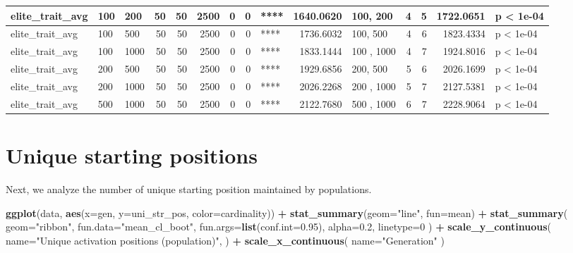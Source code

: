 \documentclass[]{book}
\newenvironment{Shaded}{\begin{snugshade}}{\end{snugshade}}
\newcommand{\DataTypeTok}[1]{\textcolor[rgb]{0.13,0.29,0.53}{#1}}
\newcommand{\DecValTok}[1]{\textcolor[rgb]{0.00,0.00,0.81}{#1}}
\newcommand{\FloatTok}[1]{\textcolor[rgb]{0.00,0.00,0.81}{#1}}
\newcommand{\KeywordTok}[1]{\textcolor[rgb]{0.13,0.29,0.53}{\textbf{#1}}}
\newcommand{\NormalTok}[1]{#1}
\newcommand{\OperatorTok}[1]{\textcolor[rgb]{0.81,0.36,0.00}{\textbf{#1}}}
\newcommand{\StringTok}[1]{\textcolor[rgb]{0.31,0.60,0.02}{#1}}
\begin{document}
\begin{tabular}{l|l|l|r|r|r|r|r|l|r|l|r|r|r|l}
\hline
elite\_trait\_avg & 100 & 200 & 50 & 50 & 2500 & 0 & 0 & **** & 1640.0620 & 100, 200 & 4 & 5 & 1722.0651 & p < 1e-04\\
\hline
elite\_trait\_avg & 100 & 500 & 50 & 50 & 2500 & 0 & 0 & **** & 1736.6032 & 100, 500 & 4 & 6 & 1823.4334 & p < 1e-04\\
\hline
elite\_trait\_avg & 100 & 1000 & 50 & 50 & 2500 & 0 & 0 & **** & 1833.1444 & 100 , 1000 & 4 & 7 & 1924.8016 & p < 1e-04\\
\hline
elite\_trait\_avg & 200 & 500 & 50 & 50 & 2500 & 0 & 0 & **** & 1929.6856 & 200, 500 & 5 & 6 & 2026.1699 & p < 1e-04\\
\hline
elite\_trait\_avg & 200 & 1000 & 50 & 50 & 2500 & 0 & 0 & **** & 2026.2268 & 200 , 1000 & 5 & 7 & 2127.5381 & p < 1e-04\\
\hline
elite\_trait\_avg & 500 & 1000 & 50 & 50 & 2500 & 0 & 0 & **** & 2122.7680 & 500 , 1000 & 6 & 7 & 2228.9064 & p < 1e-04\\
\hline
\end{tabular}

\hypertarget{unique-starting-positions-1}{%
\section{Unique starting positions}\label{unique-starting-positions-1}}

Next, we analyze the number of unique starting position maintained by populations.

\begin{Shaded}
\begin{Highlighting}[]
\KeywordTok{ggplot}\NormalTok{(data, }\KeywordTok{aes}\NormalTok{(}\DataTypeTok{x=}\NormalTok{gen, }\DataTypeTok{y=}\NormalTok{uni_str_pos, }\DataTypeTok{color=}\NormalTok{cardinality)) }\OperatorTok{+}
\StringTok{  }\KeywordTok{stat_summary}\NormalTok{(}\DataTypeTok{geom=}\StringTok{"line"}\NormalTok{, }\DataTypeTok{fun=}\NormalTok{mean) }\OperatorTok{+}
\StringTok{  }\KeywordTok{stat_summary}\NormalTok{(}
    \DataTypeTok{geom=}\StringTok{"ribbon"}\NormalTok{,}
    \DataTypeTok{fun.data=}\StringTok{"mean_cl_boot"}\NormalTok{,}
    \DataTypeTok{fun.args=}\KeywordTok{list}\NormalTok{(}\DataTypeTok{conf.int=}\FloatTok{0.95}\NormalTok{),}
    \DataTypeTok{alpha=}\FloatTok{0.2}\NormalTok{,}
    \DataTypeTok{linetype=}\DecValTok{0}
\NormalTok{  ) }\OperatorTok{+}
\StringTok{  }\KeywordTok{scale_y_continuous}\NormalTok{(}
    \DataTypeTok{name=}\StringTok{"Unique activation positions (population)"}\NormalTok{,}
\NormalTok{  ) }\OperatorTok{+}
\StringTok{  }\KeywordTok{scale_x_continuous}\NormalTok{(}
    \DataTypeTok{name=}\StringTok{"Generation"}
\NormalTok{  )}
\end{Highlighting}
\end{Shaded}
\end{document}
